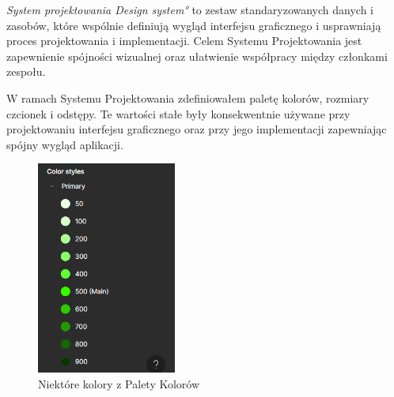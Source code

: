 \emph{System projektowania \ang{Design system}} to zestaw standaryzowanych danych i zasobów, które wspólnie definiują wygląd interfejsu graficznego i usprawniają proces projektowania i implementacji. Celem Systemu Projektowania jest zapewnienie spójności wizualnej oraz ułatwienie współpracy między członkami zespołu.
\par
W ramach Systemu Projektowania zdefiniowałem paletę kolorów, rozmiary czcionek i odstępy. Te wartości stałe były konsekwentnie używane przy projektowaniu interfejsu graficznego oraz przy jego implementacji zapewniając spójny wygląd aplikacji.
\begin{figure}[!ht]
    \centering
    \includegraphics[width=0.5\linewidth, height=7cm]{Images/figma_system_projektowania_1.png}
    \caption{Niektóre kolory z Palety Kolorów}
    \label{fig:enter-label}
\end{figure}


